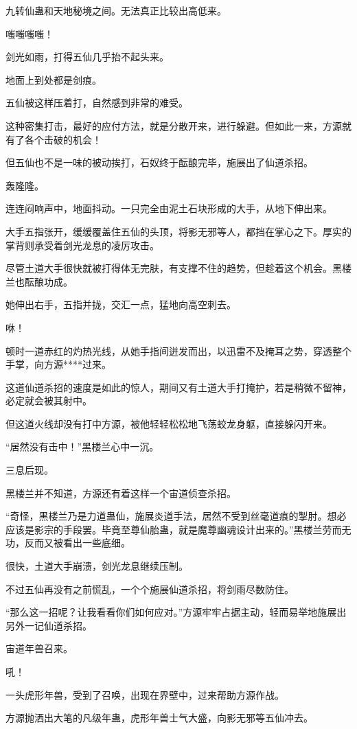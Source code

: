 \begin{this_body}
九转仙蛊和天地秘境之间。无法真正比较出高低来。

嗤嗤嗤嗤！

剑光如雨，打得五仙几乎抬不起头来。

地面上到处都是剑痕。

五仙被这样压着打，自然感到非常的难受。

这种密集打击，最好的应付方法，就是分散开来，进行躲避。但如此一来，方源就有了各个击破的机会！

但五仙也不是一味的被动挨打，石奴终于酝酿完毕，施展出了仙道杀招。

轰隆隆。

连连闷响声中，地面抖动。一只完全由泥土石块形成的大手，从地下伸出来。

大手五指张开，缓缓覆盖住五仙的头顶，将影无邪等人，都挡在掌心之下。厚实的掌背则承受着剑光龙息的凌厉攻击。

尽管土道大手很快就被打得体无完肤，有支撑不住的趋势，但趁着这个机会。黑楼兰也酝酿功成。

她伸出右手，五指并拢，交汇一点，猛地向高空刺去。

咻！

顿时一道赤红的灼热光线，从她手指间迸发而出，以迅雷不及掩耳之势，穿透整个手掌，向方源****过来。

这道仙道杀招的速度是如此的惊人，期间又有土道大手打掩护，若是稍微不留神，必定就会被其射中。

但这道火线却没有打中方源，被他轻轻松松地飞荡蛟龙身躯，直接躲闪开来。

“居然没有击中！”黑楼兰心中一沉。

三息后现。

黑楼兰并不知道，方源还有着这样一个宙道侦查杀招。

“奇怪，黑楼兰乃是力道蛊仙，施展炎道手法，居然不受到丝毫道痕的掣肘。想必应该是影宗的手段罢。毕竟至尊仙胎蛊，就是魔尊幽魂设计出来的。”黑楼兰劳而无功，反而又被看出一些底细。

很快，土道大手崩溃，剑光龙息继续压制。

不过五仙再没有之前慌乱，一个个施展仙道杀招，将剑雨尽数防住。

“那么这一招呢？让我看看你们如何应对。”方源牢牢占据主动，轻而易举地施展出另外一记仙道杀招。

宙道年兽召来。

吼！

一头虎形年兽，受到了召唤，出现在界壁中，过来帮助方源作战。

方源抛洒出大笔的凡级年蛊，虎形年兽士气大盛，向影无邪等五仙冲去。


\end{this_body}
